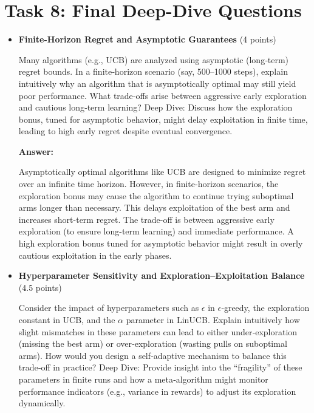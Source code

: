 \documentclass[12pt]{article}
\begin{document}
{{{\begin{itemize}[noitemsep]
\begin{itemize}[noitemsep]
    \end{itemize}
\end{itemize}

\section{Task 8: Final Deep-Dive Questions}
\begin{itemize}[noitemsep]
    \item \textbf{Finite-Horizon Regret and Asymptotic Guarantees} (4 points)
    
    \vspace{0.25cm}
    Many algorithms (e.g., UCB) are analyzed using asymptotic (long‑term) regret bounds. In a finite‑horizon scenario (say, 500–1000 steps), explain intuitively why an algorithm that is asymptotically optimal may still yield poor performance. What trade‑offs arise between aggressive early exploration and cautious long‑term learning?
    Deep Dive:
    Discuss how the exploration bonus, tuned for asymptotic behavior, might delay exploitation in finite time, leading to high early regret despite eventual convergence.
    \vspace{0.5cm}

    \textbf{Answer:}

    Asymptotically optimal algorithms like UCB are designed to minimize regret over an infinite time horizon. However, in finite-horizon scenarios, the exploration bonus may cause the algorithm to continue trying suboptimal arms longer than necessary. This delays exploitation of the best arm and increases short-term regret. The trade-off is between aggressive early exploration (to ensure long-term learning) and immediate performance. A high exploration bonus tuned for asymptotic behavior might result in overly cautious exploitation in the early phases.
    
    \item \textbf{Hyperparameter Sensitivity and Exploration–Exploitation Balance} (4.5 points)

    \vspace{0.25cm}
    Consider the impact of hyperparameters such as $\epsilon$ in $\epsilon$‑greedy, the exploration constant in UCB, and the $\alpha$ parameter in LinUCB. Explain intuitively how slight mismatches in these parameters can lead to either under‑exploration (missing the best arm) or over‑exploration (wasting pulls on suboptimal arms). How would you design a self‑adaptive mechanism to balance this trade‑off in practice?
    Deep Dive:
    Provide insight into the “fragility” of these parameters in finite runs and how a meta‑algorithm might monitor performance indicators (e.g., variance in rewards) to adjust its exploration dynamically.
    \vspace{0.5cm}


\end{itemize}}}}
\end{document}
